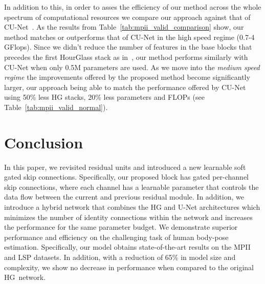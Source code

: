 \documentclass[a4paper, 10pt, conference]{ieeeconf}      \usepackage{FG2020}
\begin{document}
In addition to this, in order to asses the efficiency of our method  across the whole spectrum of computational resources we compare our approach against that of CU-Net~\cite{tang2018cu}. As the results from Table~\ref{tab:mpii_valid_comparison} show, our method matches or outperforms that of CU-Net in the high speed regime (0.7-4 GFlops). Since we didn't reduce the number of features in the base blocks that precedes the first HourGlass stack as in~\cite{tang2018cu}, our method performs similarly with CU-Net when only 0.5M parameters are used. As we move into the \textit{medium speed regime} the improvements offered by the proposed method become significantly larger, our approach being able to match the performance offered by CU-Net using 50\% less HG stacks, 20\% less parameters and FLOPs (see Table~\ref{tab:mpii_valid_normal}). 
\section{Conclusion}\label{sec:conclusion}

In this paper, we revisited residual units and introduced a new learnable soft gated skip connections. Specifically, our proposed block has gated per-channel skip connections, where each channel has a learnable parameter that controls the data flow between the current and previous residual module. 
In addition, we introduce a hybrid network  that combines the HG and U-Net architectures which minimizes the number of identity connections within the network and increases the performance for the same parameter budget.
We demonstrate superior performance and efficiency on the challenging task of human body-pose estimation. 
Specifically, our model obtains state-of-the-art results on the MPII and LSP datasets.  In addition, with a reduction of 65\% in model size and complexity, we show no decrease in performance when compared to the original HG~network. 
{\small


}
\end{document}
